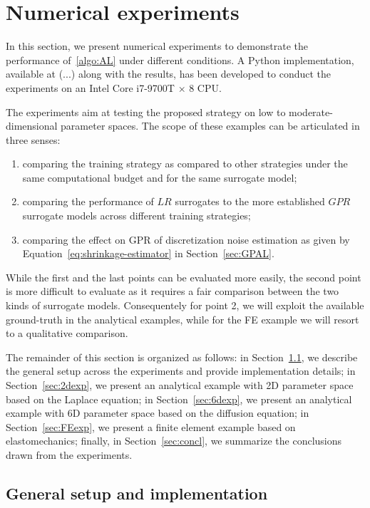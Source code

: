 \section{Numerical experiments}\label{sec:exp}

In this section, we present numerical experiments to demonstrate the performance of~\ref{algo:AL} under different conditions. 
A Python implementation, available at (...) along with the results, has been developed to conduct the experiments on an Intel Core i7-9700T × 8 CPU. \medskip

The experiments aim at testing the proposed strategy on low to moderate-dimensional parameter spaces.
The scope of these examples can be articulated in three senses:
\begin{enumerate}
    \item comparing the training strategy as compared to other strategies under the same computational budget and for the same surrogate model;
    \item comparing the performance of $LR$ surrogates to the more established $GPR$ surrogate models across different training strategies;
    \item comparing the effect on GPR of discretization noise estimation as given by Equation~\eqref{eq:shrinkage-estimator} in Section~\ref{sec:GPAL}.
\end{enumerate}
While the first and the last points can be evaluated more easily, the second point is more difficult to evaluate as it requires a fair comparison between the two kinds of surrogate models.
Consequentely for point 2, we will exploit the available ground-truth in the analytical examples, while for the FE example we will resort to a qualitative comparison. \medskip

The remainder of this section is organized as follows: in Section~\ref{sec:setup}, we describe the general setup across the experiments and provide implementation details; in Section~\ref{sec:2dexp}, we present an analytical example with 2D parameter space based on the Laplace equation; in Section~\ref{sec:6dexp}, we present an analytical example with 6D parameter space based on the diffusion equation; in Section~\ref{sec:FEexp}, we present a finite element example based on elastomechanics; finally, in Section~\ref{sec:concl}, we summarize the conclusions drawn from the experiments.

\subsection{General setup and implementation}\label{sec:setup}

